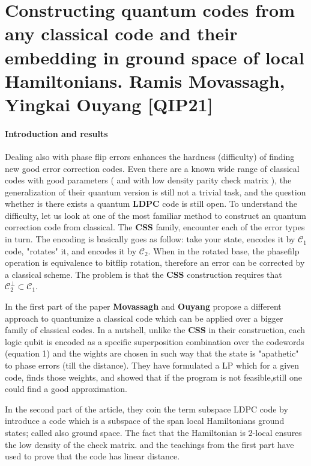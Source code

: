 \documentclass{article}
\begin{document}
\section*{Constructing quantum codes from any classical code and
their embedding in ground space of local Hamiltonians. Ramis Movassagh, Yingkai Ouyang [QIP21] }
\paragraph{Introduction and results} Dealing also with phase flip errors enhances the hardness (difficulty) of finding new good error correction codes. Even there are a known wide range of classical codes with good parameters ( and with low density parity check matrix ), the generalization of their quantum version is still not a trivial task, and the question whether is there exists a quantum \textbf{LDPC} code is still open. To understand the difficulty, let us look at one of the most familiar method to construct an quantum correction code from classical. The \textbf{CSS} family, encounter each of the error types in turn. The encoding is basically goes as follow: take your state, encodes it by \( \mathcal{C}_1 \) code,  "rotates" it, and encodes it by \( \mathcal{C}_2 \). When in the rotated base, the phasefilp operation is equivalence to bitflip rotation, therefore an error can be corrected by a classical scheme. 
The problem is that the \textbf{CSS} construction requires that  \( \mathcal{C}_{2}^{\perp} \subset \mathcal{C}_{1}\). 

In the first part of the paper \textbf{Movassagh} and \textbf{Ouyang} propose a different approach to quantumize a classical code which can be applied over a bigger family of classical codes. In a nutshell, unlike the \textbf{CSS} in their construction, each logic qubit is encoded as a specific superposition combination over the codewords (equation 1) and the wights are chosen in such way that the state is "apathetic" to phase errors (till the distance). They have formulated a LP which for a given code, finds those weights, and showed that if the program is not feasible,still one could find a good approximation.  

In the second part of the article, they coin the term subspace LDPC code by  introduce a code which is a subspace of the span local Hamiltonians ground states; called also ground space. The fact that the Hamiltonian is 2-local ensures the low density of the check matrix. and the teachings from the first part have used to prove that the code has linear distance. 
\end{document}
